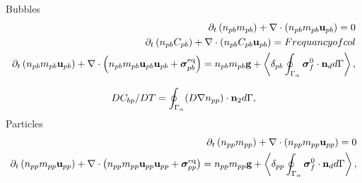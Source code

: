 \documentclass[12pt]{My_preprint}
\begin{document}
Bubbles 
\begin{align*}
    \partial_t \left(n_{pb} m_{pb}\right)
    + \mathbf{\nabla}\cdot \left(n_{pb}m_{pb}\textbf{u}_{pb}
    \right)
    = 
    0\\
    \partial_t \left(n_{pb} C_{pb}\right)
    + \mathbf{\nabla}\cdot \left(n_{pb}C_{pb}\textbf{u}_{pb}
    \right)
    = 
    Frequancy of col
    \\
    \partial_t \left(n_{pb} m_{pb} \textbf{u}_{pb}\right)
    + \mathbf{\nabla}\cdot \left(n_{pb}
    m_{pb} \textbf{u}_{pb} \textbf{u}_{pb} 
    + \bm{\sigma}_{pb}^\text{eq}
    \right)
    = 
    n_{pb} m_{pb} \textbf{g}
    + \left<\delta_{pb} \oint_{\Gamma_{\alpha}} \bm{\sigma}_f^0 \cdot \textbf{n}_d d\Gamma\right>,
\end{align*}

\begin{equation*}
    DC_{bp}/DT
    =\oint_{\Gamma_{\alpha}} 
    (D\mathbf{\nabla} n_{pp} )
    \cdot \textbf{n}_2
     d\Gamma,
\end{equation*}
Particles 
\begin{align*}
    \partial_t \left(n_{pp} m_{pp}\right)
    + \mathbf{\nabla}\cdot \left(n_{pp}m_{pp}\textbf{u}_{pp}
    \right)
    = 
    0\\
    \partial_t \left(n_{pp} m_{pp} \textbf{u}_{pp}\right)
    + \mathbf{\nabla}\cdot \left(n_{pp}
    m_{pp} \textbf{u}_{pp} \textbf{u}_{pp} 
    + \bm{\sigma}_{pp}^\text{eq}
    \right)
    = 
    n_{pp} m_{pp} \textbf{g}
    + \left<\delta_{pp} \oint_{\Gamma_{\alpha}} \bm{\sigma}_f^0 \cdot \textbf{n}_d d\Gamma\right>,
\end{align*}

\appendix
\end{document}
